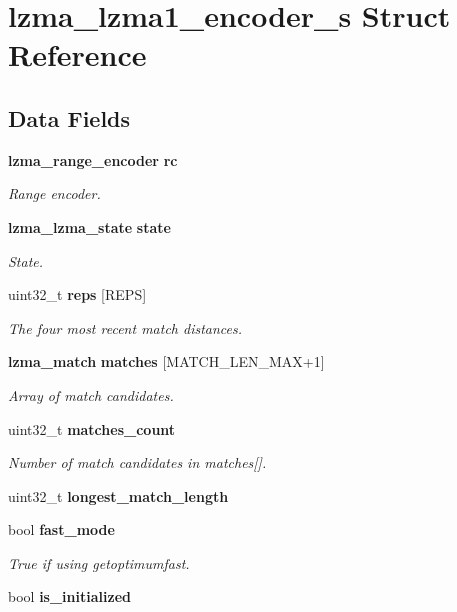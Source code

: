 \section{lzma\+\_\+lzma1\+\_\+encoder\+\_\+s Struct Reference}
\label{structlzma__lzma1__encoder__s}
\subsection*{Data Fields}
\begin{DoxyCompactItemize}
\item 
\textbf{ lzma\+\_\+range\+\_\+encoder} \textbf{ rc}
\begin{DoxyCompactList}\small\item\em Range encoder. \end{DoxyCompactList}\item 
\textbf{ lzma\+\_\+lzma\+\_\+state} \textbf{ state}
\begin{DoxyCompactList}\small\item\em State. \end{DoxyCompactList}\item 
uint32\+\_\+t \textbf{ reps} [R\+E\+PS]
\begin{DoxyCompactList}\small\item\em The four most recent match distances. \end{DoxyCompactList}\item 
\textbf{ lzma\+\_\+match} \textbf{ matches} [M\+A\+T\+C\+H\+\_\+\+L\+E\+N\+\_\+\+M\+AX+1]
\begin{DoxyCompactList}\small\item\em Array of match candidates. \end{DoxyCompactList}\item 
uint32\+\_\+t \textbf{ matches\+\_\+count}
\begin{DoxyCompactList}\small\item\em Number of match candidates in matches[]. \end{DoxyCompactList}\item 
uint32\+\_\+t \textbf{ longest\+\_\+match\+\_\+length}
\item 
bool \textbf{ fast\+\_\+mode}
\begin{DoxyCompactList}\small\item\em True if using getoptimumfast. \end{DoxyCompactList}\item 
bool \textbf{ is\+\_\+initialized}

\end{DoxyCompactItemize}
